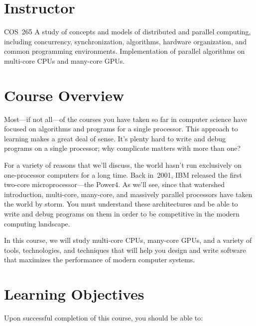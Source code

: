 \documentclass[11pt]{article}
\begin{document}


\section{Instructor}



\begin{catalogentry}{COS~265}
  A study of concepts and models of distributed and parallel computing,
  including concurrency, synchronization, algorithms, hardware organization,
  and common programming environments.
  Implementation of parallel algorithms on multi-core CPUs and many-core GPUs.   
\end{catalogentry}

\section{Course Overview}

Most---if not all---of the courses
you have taken so far in computer science
have focused on algorithms and programs
for a single processor.
This approach to learning makes a great deal of sense.
It's plenty hard to write and debug programs
on a single processor;
why complicate matters with more than one?

For a variety of reasons that we'll discuss,
the world hasn't run exclusively on one-processor computers
for a long time.
Back in~2001, IBM released the first
two-core microprocessor---the Power4.
As we'll see,
since that watershed introduction,
multi-core, many-core, and massively parallel processors
have taken the world by storm.
You must understand these architectures
and be able to write and debug programs on them
in order to be competitive in the modern computing landscape.

In this course,
we will study
multi-core CPUs,
many-core GPUs,
and a variety of tools, technologies, and techniques
that will help you
design and write software
that maximizes the performance of modern computer systems.

\section{Learning Objectives}

Upon successful completion of this course, you should be able to:
\end{document}

